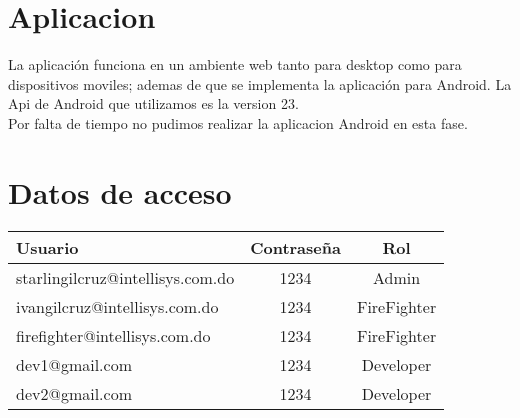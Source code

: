 \documentclass[12pt]{article}
\begin{document}
\section{Aplicacion}
La aplicación funciona en un ambiente web tanto para desktop como para dispositivos moviles; ademas de que se implementa la aplicación para Android. La Api de Android que utilizamos es la version 23.\\ 

Por falta de tiempo no pudimos realizar la aplicacion Android en esta fase.

\section{Datos de acceso}

\begin{tabular}{l c c}
Usuario & Contraseña & Rol\\ \hline
starlingilcruz@intellisys.com.do & 1234 & Admin\\
ivangilcruz@intellisys.com.do & 1234 & FireFighter\\
firefighter@intellisys.com.do & 1234 & FireFighter\\
dev1@gmail.com & 1234 & Developer\\
dev2@gmail.com & 1234 & Developer
\end{tabular}
\end{document}
